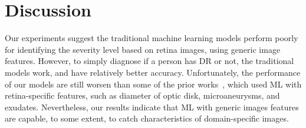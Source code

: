 \section{Discussion}
Our experiments suggest the traditional machine learning models perform poorly 
for identifying the severity level based on retina images, using generic image 
features. However, to simply diagnose if a person has DR or not, the traditional 
models work, and have relatively better accuracy. Unfortunately, the performance 
of our models are still worsen than some of the prior works~\cite{1,2,3}, which used ML with  
retina-specific features, such as diameter of optic disk, microaneurysms, 
and exudates. Nevertheless, our results indicate that ML with  
generic images features are capable, to some extent, to catch 
characteristics of domain-specific images. 






